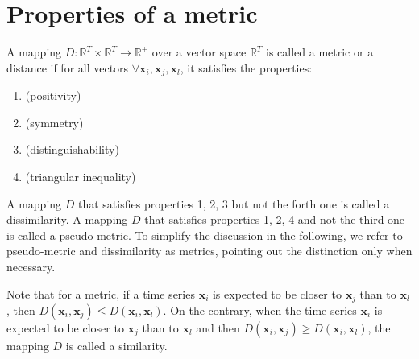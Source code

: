 \newpage
\section{Properties of a metric}
A mapping $D:\mathbb{R}^T \times \mathbb{R}^T \rightarrow \mathbb{R}^+$ over a vector space $\mathbb{R}^T$ is called a metric or a distance if for all vectors $\forall \textbf{x}_i, \textbf{x}_j, \textbf{x}_l$, it satisfies the properties:
\begin{enumerate}
	\item { (positivity)}
	\item { (symmetry)}	
	\item { (distinguishability)}
	\item { (triangular inequality)}
\end{enumerate}
A mapping $D$ that satisfies properties 1, 2, 3 but not the forth one is called a dissimilarity. A mapping $D$ that satisfies properties 1, 2, 4 and not the third one is called a pseudo-metric. To simplify the discussion in the following, we refer to pseudo-metric and dissimilarity as metrics, pointing out the distinction only when necessary.

Note that for a metric, if a time series $\textbf{x}_i$ is expected to be closer to $\textbf{x}_j$ than to $\textbf{x}_l$, then $D(\textbf{x}_i,\textbf{x}_j) \leq D(\textbf{x}_i,\textbf{x}_l)$. On the contrary, when the time series $\textbf{x}_i$ is expected to be closer to $\textbf{x}_j$ than to $\textbf{x}_l$ and then $D(\textbf{x}_i,\textbf{x}_j) \geq D(\textbf{x}_i,\textbf{x}_l)$, the mapping $D$ is called a similarity.


